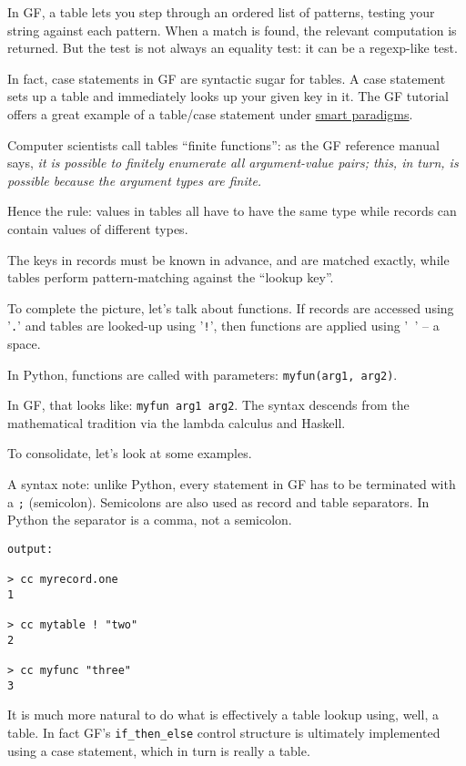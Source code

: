 \documentclass{scrartcl}
\begin{document}
In GF, a table lets you step through an ordered list of patterns, testing your string against each pattern. When a match is found, the relevant computation is returned. But the test is not always an equality test: it can be a regexp-like test.

In fact, case statements in GF are syntactic sugar for tables. A case statement sets up a table and immediately looks up your given key in it. The GF tutorial offers a great example of a table/case statement under \href{http://www.grammaticalframework.org/doc/tutorial/gf-tutorial.html#toc59}{smart paradigms}.

Computer scientists call tables ``finite functions'': as the GF reference manual says, \textit{it is possible to finitely enumerate all argument-value pairs; this, in turn, is possible because the argument types are finite.}

Hence the rule: values in tables all have to have the same type while records can contain values of different types.

The keys in records must be known in advance, and are matched exactly, while tables perform pattern-matching against the ``lookup key''.

To complete the picture, let's talk about functions. If records are accessed using '\texttt{.}' and tables are looked-up using '\texttt{!}', then functions are applied using '\texttt{ }' -- a space.

In Python, functions are called with parameters: \texttt{myfun(arg1, arg2)}.

In GF, that looks like: \texttt{myfun arg1 arg2}. The syntax descends from the mathematical tradition via the lambda calculus and Haskell.

To consolidate, let's look at some examples.



A syntax note: unlike Python, every statement in GF has to be terminated with a \texttt{;} (semicolon). Semicolons are also used as record and table separators. In Python the separator is a comma, not a semicolon.

\begin{verbatim}
output:

> cc myrecord.one
1

> cc mytable ! "two"
2

> cc myfunc "three"
3
\end{verbatim}

It is much more natural to do what is effectively a table lookup using, well, a table. In fact GF's \texttt{if\_then\_else} control structure is ultimately implemented using a case statement, which in turn is really a table.
\end{document}
